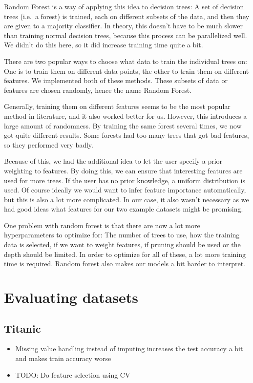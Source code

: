 \documentclass[a4paper]{article}
\begin{document}
Random Forest is a way of applying this idea to decision trees: A set of decision trees (i.e.\ a forest) is trained, each on different subsets of the data, and then they are given to a majority classifier. In theory, this doesn't have to be much slower than training normal decision trees, because this process can be parallelized well. We didn't do this here, so it did increase training time quite a bit.

There are two popular ways to choose what data to train the individual trees on: One is to train them on different data points, the other to train them on different features. We implemented both of these methods. These subsets of data or features are chosen randomly, hence the name Random Forest.

Generally, training them on different features seems to be the most popular method in literature, and it also worked better for us. However, this introduces a large amount of randomness. By training the same forest several times, we now got quite different results. Some forests had too many trees that got bad features, so they performed very badly.

Because of this, we had the additional idea to let the user specify a prior weighting to features. By doing this, we can ensure that interesting features are used for more trees. If the user has no prior knowledge, a uniform distribution is used. Of course ideally we would want to infer feature importance automatically, but this is also a lot more complicated. In our case, it also wasn't necessary as we had good ideas what features for our two example datasets might be promising.

One problem with random forest is that there are now a lot more hyperparameters to optimize for: The number of trees to use, how the training data is selected, if we want to weight features, if pruning should be used or the depth should be limited. In order to optimize for all of these, a lot more training time is required. Random forest also makes our models a bit harder to interpret.

\section{Evaluating datasets}

\subsection{Titanic}

\begin{itemize}
	\item Missing value handling instead of imputing increases the test accuracy a bit and makes train accuracy worse
    \item TODO: Do feature selection using CV
\end{itemize}
\end{document}
